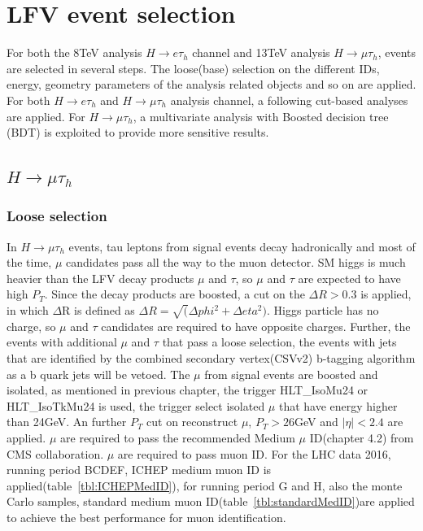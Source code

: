 %
%

\chapter{LFV event selection}
For both the 8TeV analysis $H\rightarrow e\tau_h$ channel and 13TeV analysis  $H\rightarrow\mu\tau_h$, events are selected in several steps. The loose(base) selection on the different IDs, energy, geometry parameters of the analysis related objects and so on are applied. For both  $H\rightarrow e\tau_h$ and $H\rightarrow\mu\tau_h$ analysis channel, a following cut-based analyses are applied. For $H\rightarrow\mu\tau_h$, a multivariate analysis with Boosted decision tree (BDT) is exploited to provide more sensitive results. 



\section{\texorpdfstring{$H\rightarrow\mu\tau_h$}{Lg}}
\subsection{Loose selection}
In $H\rightarrow\mu\tau_h$ events, tau leptons from signal events decay hadronically and most of the time, $\mu$ candidates pass all the way to the muon detector. SM higgs is much heavier than the LFV decay products $\mu$ and $\tau$, so $\mu$ and $\tau$ are expected to have high $P_{T}$. Since the decay products are boosted, a cut on the $\Delta R>0.3$ is applied, in which $\Delta$R is defined as $\Delta R=\sqrt(\Delta phi^{2}+\Delta eta^{2})$. Higgs particle has no charge, so $\mu$ and $\tau$ candidates are required to have opposite charges. Further, the events with additional $\mu$ and $\tau$ that pass a loose selection, the events with jets that are identified by the combined secondary vertex(CSVv2) b-tagging algorithm \cite{btag_ago} as a b quark jets will be vetoed. The $\mu$ from signal events are boosted and isolated, as mentioned in previous chapter, the trigger HLT\_IsoMu24 or HLT\_IsoTkMu24 is used, the trigger select isolated $\mu$ that have energy higher than 24GeV. An further $P_{T}$ cut on reconstruct $\mu$,  $P_{T}>26$GeV and $|\eta|<2.4$ are applied. $\mu$ are required to pass the recommended Medium $\mu$ ID(chapter 4.2) from CMS collaboration. $\mu$ are required to pass muon ID. For the LHC data 2016, running period BCDEF, ICHEP medium muon ID is applied(table~\ref{tbl:ICHEPMedID}), for running period G and H, also the monte Carlo samples, standard medium muon ID(table~\ref{tbl:standardMedID})are applied to achieve the best performance for muon identification.

